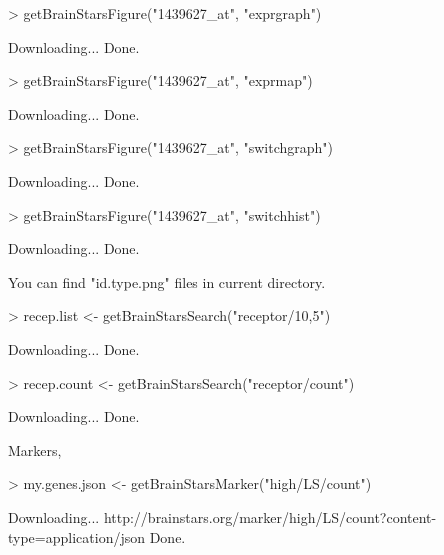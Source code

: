 \documentclass[12pt,fullpage]{article}
\begin{document}
\begin{Schunk}
\begin{Sinput}
> getBrainStarsFigure("1439627_at", "exprgraph")
\end{Sinput}
\begin{Soutput}
Downloading...
Done.
\end{Soutput}
\begin{Sinput}
> getBrainStarsFigure("1439627_at", "exprmap")
\end{Sinput}
\begin{Soutput}
Downloading...
Done.
\end{Soutput}
\begin{Sinput}
> getBrainStarsFigure("1439627_at", "switchgraph")
\end{Sinput}
\begin{Soutput}
Downloading...
Done.
\end{Soutput}
\begin{Sinput}
> getBrainStarsFigure("1439627_at", "switchhist")
\end{Sinput}
\begin{Soutput}
Downloading...
Done.
\end{Soutput}
\end{Schunk}

You can find "id.type.png" files in current directory.

\begin{Schunk}
\begin{Sinput}
> recep.list <- getBrainStarsSearch("receptor/10,5")
\end{Sinput}
\begin{Soutput}
Downloading...
Done.
\end{Soutput}
\begin{Sinput}
> recep.count <- getBrainStarsSearch("receptor/count")
\end{Sinput}
\begin{Soutput}
Downloading...
Done.
\end{Soutput}
\end{Schunk}

Markers,
\begin{Schunk}
\begin{Sinput}
> my.genes.json <- getBrainStarsMarker("high/LS/count")
\end{Sinput}
\begin{Soutput}
Downloading...
http://brainstars.org/marker/high/LS/count?content-type=application/json 
Done.
\end{Soutput}
\end{Schunk}
\end{document}
